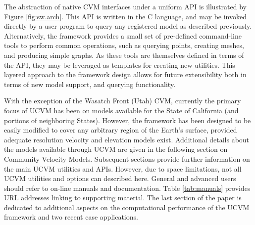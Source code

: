 The abstraction of native CVM interfaces under a uniform API is illustrated by Figure \ref{fig:sw.arch}. This API is written in the C language, and may be invoked directly by a user program to query any registered model as described previously. Alternatively, the framework provides a small set of pre-defined command-line tools to perform common operations, such as querying points, creating meshes, and producing simple graphs. As these tools are themselves defined in terms of the API, they may be leveraged as templates for creating new utilities. This layered approach to the framework design allows for future extensibility both in terms of new model support, and querying functionality.

With the exception of the Wasatch Front (Utah) CVM, currently the primary focus of UCVM has been on models available for the State of California (and portions of neighboring States). However, the framework has been designed to be easily modified to cover any arbitrary region of the Earth's surface, provided adequate resolution velocity and elevation models exist. Additional details about the models available through UCVM are given in the following section on Community Velocity Models. Subsequent sections provide further information on the main UCVM utilities and APIs. However, due to space limitations, not all UCVM utilities and options can described here. General and advanced users should refer to on-line manuals and documentation. Table \ref{tab:manuals} provides URL addresses linking to supporting material. The last section of the paper is dedicated to additional aspects on the computational performance of the UCVM framework and two recent case applications. 






